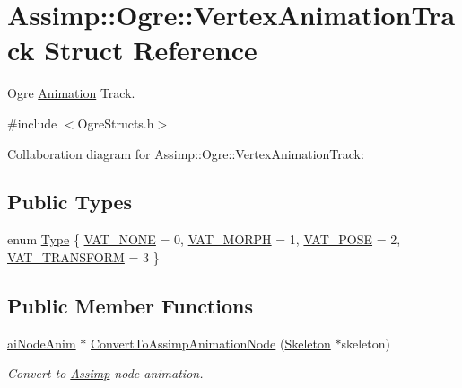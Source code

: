 \hypertarget{struct_assimp_1_1_ogre_1_1_vertex_animation_track}{\section{Assimp\+:\+:Ogre\+:\+:Vertex\+Animation\+Track Struct Reference}
\label{struct_assimp_1_1_ogre_1_1_vertex_animation_track}
}


Ogre \hyperlink{class_assimp_1_1_ogre_1_1_animation}{Animation} Track.  




{\ttfamily \#include $<$Ogre\+Structs.\+h$>$}



Collaboration diagram for Assimp\+:\+:Ogre\+:\+:Vertex\+Animation\+Track\+:
\subsection*{Public Types}
\begin{DoxyCompactItemize}
\item 
enum \hyperlink{struct_assimp_1_1_ogre_1_1_vertex_animation_track_a37591fc343c62d6911905ed23306f5e9}{Type} \{ \hyperlink{struct_assimp_1_1_ogre_1_1_vertex_animation_track_a37591fc343c62d6911905ed23306f5e9ae5c3e8bc3e522a5086ebfa084d23ca12}{V\+A\+T\+\_\+\+N\+O\+N\+E} = 0, 
\hyperlink{struct_assimp_1_1_ogre_1_1_vertex_animation_track_a37591fc343c62d6911905ed23306f5e9a4c314a0ce45dbe5f5356453da2173164}{V\+A\+T\+\_\+\+M\+O\+R\+P\+H} = 1, 
\hyperlink{struct_assimp_1_1_ogre_1_1_vertex_animation_track_a37591fc343c62d6911905ed23306f5e9ad690c5c89b97848c9282a87caf73b790}{V\+A\+T\+\_\+\+P\+O\+S\+E} = 2, 
\hyperlink{struct_assimp_1_1_ogre_1_1_vertex_animation_track_a37591fc343c62d6911905ed23306f5e9af276d67e2c32d6c35a6b804ebc52fc0d}{V\+A\+T\+\_\+\+T\+R\+A\+N\+S\+F\+O\+R\+M} = 3
 \}
\end{DoxyCompactItemize}
\subsection*{Public Member Functions}
\begin{DoxyCompactItemize}
\item 
\hypertarget{struct_assimp_1_1_ogre_1_1_vertex_animation_track_a53a1dc9934421c13faee4ffab6c2a59a}{\hyperlink{structai_node_anim}{ai\+Node\+Anim} $\ast$ \hyperlink{struct_assimp_1_1_ogre_1_1_vertex_animation_track_a53a1dc9934421c13faee4ffab6c2a59a}{Convert\+To\+Assimp\+Animation\+Node} (\hyperlink{class_assimp_1_1_ogre_1_1_skeleton}{Skeleton} $\ast$skeleton)}\label{struct_assimp_1_1_ogre_1_1_vertex_animation_track_a53a1dc9934421c13faee4ffab6c2a59a}

\begin{DoxyCompactList}\small\item\em Convert to \hyperlink{class_assimp}{Assimp} node animation. \end{DoxyCompactList}\end{DoxyCompactItemize}
